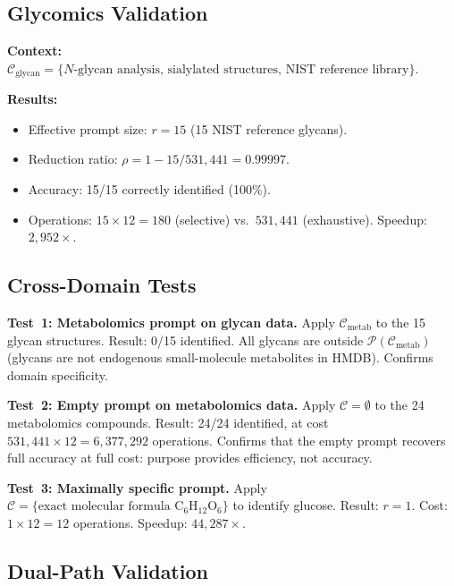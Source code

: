 \subsection{Glycomics Validation}
\label{sec:ch24-glycan-val}

\noindent\textbf{Context:}
$\mathcal{C}_{\mathrm{glycan}} = \{N\text{-glycan analysis, sialylated
structures, NIST reference library}\}$.

\noindent\textbf{Results:}
\begin{itemize}[noitemsep]
  \item Effective prompt size: $r = 15$ (15 NIST reference glycans).
  \item Reduction ratio: $\rho = 1 - 15/531{,}441 = 0.99997$.
  \item Accuracy: 15/15 correctly identified (100\%).
  \item Operations: $15 \times 12 = 180$ (selective)
    vs.\ $531{,}441$ (exhaustive).  Speedup: $2{,}952\times$.
\end{itemize}

\subsection{Cross-Domain Tests}
\label{sec:ch24-cross}

\noindent\textbf{Test~1: Metabolomics prompt on glycan data.}
Apply $\mathcal{C}_{\mathrm{metab}}$ to the 15 glycan structures.
Result: 0/15 identified.  All glycans are outside
$\mathcal{P}(\mathcal{C}_{\mathrm{metab}})$ (glycans are not endogenous
small-molecule metabolites in HMDB).  Confirms domain specificity.

\noindent\textbf{Test~2: Empty prompt on metabolomics data.}
Apply $\mathcal{C} = \emptyset$ to the 24 metabolomics compounds.
Result: 24/24 identified, at cost $531{,}441 \times 12 = 6{,}377{,}292$
operations.  Confirms that the empty prompt recovers full accuracy at full
cost: purpose provides efficiency, not accuracy.

\noindent\textbf{Test~3: Maximally specific prompt.}
Apply $\mathcal{C} = \{\text{exact molecular formula C}_6\text{H}_{12}\text{O}_6\}$
to identify glucose.
Result: $r = 1$.  Cost: $1 \times 12 = 12$ operations.  Speedup: $44{,}287\times$.

\subsection{Dual-Path Validation}
\label{sec:ch24-dual-val}

